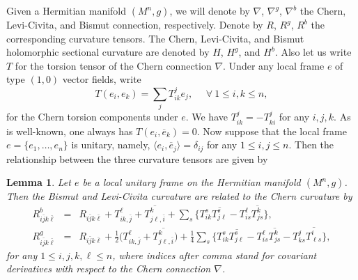 \documentclass{amsart}
\newtheorem{lemma}{Lemma}
\numberwithin{equation}{section}
\begin{document}
Given a Hermitian manifold $(M^n,g)$, we will denote by $\nabla$, $\nabla^g$, $\nabla^b$ the Chern, Levi-Civita, and Bismut connection, respectively. Denote by $R$, $R^g$, $R^b$ the corresponding curvature tensors. The Chern, Levi-Civita, and Bismut holomorphic sectional curvature are denoted by $H$, $H^g$, and $H^b$. Also let us write $T$ for the torsion tensor of the Chern connection $\nabla$. Under any local frame $e$ of type $(1,0)$ vector fields, write
\begin{equation}
T(e_i,e_k) = \sum_j T^j_{ik} e_j, \ \ \ \  \ \ \forall \ 1\leq i,k\leq n,
\end{equation}
for the Chern torsion components under $e$. We have $T^j_{ik}=-T^j_{ki}$ for any $i,j,k$. As is well-known, one always has $T(e_i, \overline{e}_k)=0$.
Now suppose that the local frame  $e=\{ e_1, \ldots , e_n\}$ is unitary, namely, $\langle e_i, \overline{e}_j\rangle = \delta_{ij}$ for any $1\leq i,j\leq n$. Then the relationship between the three curvature tensors are given by

\begin{lemma}
Let $e$ be a local unitary frame on the Hermitian manifold $(M^n,g)$. Then the Bismut and Levi-Civita curvature are related to the Chern curvature by
\begin{eqnarray}
R^b_{i\bar{j}k\bar{\ell}} & = & R_{i\bar{j}k\bar{\ell}} +T^{\ell}_{ik,\bar{j}} + \overline{ T^k_{j\ell ,\bar{i}} } +\sum_s \big\{ T^s_{ik} \overline{ T^s_{j\ell }} - T^{\ell}_{is} \overline{ T^k_{js }} \big\},   \label{eq:RbR}\\
R^g_{i\bar{j}k\bar{\ell}} & = & R_{i\bar{j}k\bar{\ell}}  + \frac{1}{2} \big( T^{\ell}_{ik,\bar{j}} + \overline{ T^k_{j\ell ,\bar{i}} } \big)  +\frac{1}{4}\sum_s \big\{ T^s_{ik} \overline{ T^s_{j\ell }} - T^{\ell}_{is} \overline{ T^k_{js }} - T^{j}_{ks} \overline{ T^i_{\ell s }} \big\}, \label{eq:RgR}
\end{eqnarray}
for any $1\leq i,j,k,\ell \leq n$, where indices after comma stand for covariant derivatives with respect to the Chern connection $\nabla$.
\end{lemma}
\end{document}
